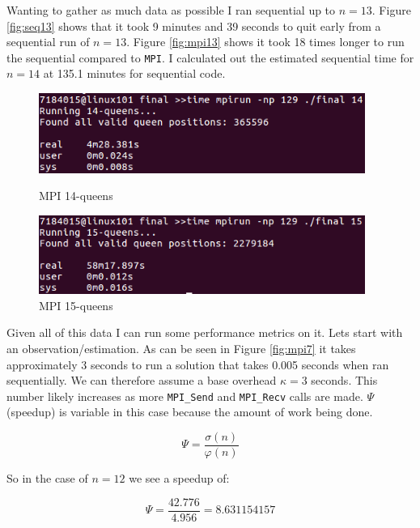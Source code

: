 \documentclass{article}
\begin{document}
Wanting to gather as much data as possible I ran sequential up to $n=13$. Figure 
\ref{fig:seq13} shows that it took 9 minutes and 39 seconds to quit early from a 
sequential run of $n=13$. Figure \ref{fig:mpi13} shows it took 18 times longer 
to run the sequential compared to \verb|MPI|. I calculated out the estimated 
sequential time for $n=14$ at 135.1 minutes for sequential code.

\begin{figure}[h]
    \centering
    \begin{minipage}{0.49\textwidth}
        \centering
        \includegraphics[width=0.95\textwidth]{images/MPI_14}
        \caption{MPI 14-queens}
        \label{fig:mpi14}
    \end{minipage}\hfill
    \begin{minipage}{0.49\textwidth}
        \centering
        \includegraphics[width=0.95\textwidth]{images/MPI_15}
        \caption{MPI 15-queens}
        \label{fig:mpi15}
    \end{minipage}
\end{figure}


Given all of this data I can run some performance metrics on it. Lets start with 
an observation/estimation. As can be seen in Figure \ref{fig:mpi7} it takes 
approximately 3 seconds to run a solution that takes 0.005 seconds when ran 
sequentially. We can therefore assume a base overhead $\kappa = 3$ seconds. This 
number likely increases as more \verb|MPI_Send| and \verb|MPI_Recv| calls are 
made. $\Psi$ (speedup) is variable in this case because the amount of work being 
done. 

$$\Psi = \frac{\sigma(n)}{\varphi(n)}$$

So in the case of $n=12$ we see a speedup of:

$$\Psi = \frac{42.776}{4.956} = 8.631154157$$
\end{document}

